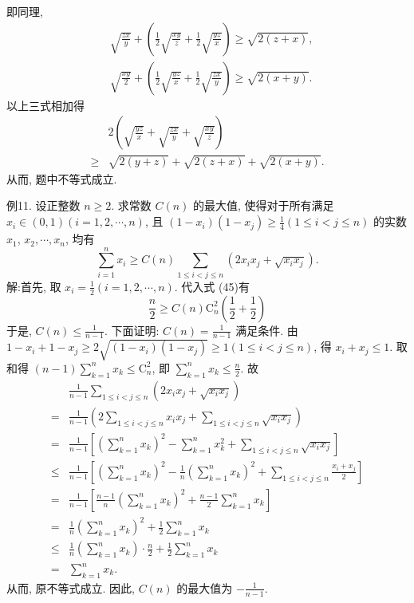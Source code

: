 即同理,
$$
\begin{aligned}
& \sqrt{\frac{z x}{y}}+\left(\frac{1}{2} \sqrt{\frac{x y}{z}}+\frac{1}{2} \sqrt{\frac{y z}{x}}\right) \geqslant \sqrt{2(z+x)}, \\
& \sqrt{\frac{x y}{2}}+\left(\frac{1}{2} \sqrt{\frac{y z}{x}}+\frac{1}{2} \sqrt{\frac{z x}{y}}\right) \geqslant \sqrt{2(x+y)} .
\end{aligned}
$$
以上三式相加得
$$
\begin{aligned}
& 2\left(\sqrt{\frac{y z}{x}}+\sqrt{\frac{z x}{y}}+\sqrt{\frac{x y}{z}}\right) \\
\geqslant & \sqrt{2(y+z)}+\sqrt{2(z+x)}+\sqrt{2(x+y)} .
\end{aligned}
$$
从而, 题中不等式成立.



例11. 设正整数 $n \geqslant 2$. 求常数 $C(n)$ 的最大值, 使得对于所有满足 $x_i \in (0,1)(i=1,2, \cdots, n)$, 且 $\left(1-x_i\right)\left(1-x_j\right) \geqslant \frac{1}{4}(1 \leqslant i<j \leqslant n)$ 的实数 $x_1$, $x_2, \cdots, x_n$, 均有
$$
\sum_{i=1}^n x_i \geqslant C(n) \sum_{1 \leqslant i<j \leqslant n}\left(2 x_i x_j+\sqrt{x_i x_j}\right) . \label{(45)}
$$
解:首先, 取 $x_i=\frac{1}{2}(i=1,2, \cdots, n)$. 代入式 (45)有
$$
\frac{n}{2} \geqslant C(n) \mathrm{C}_n^2\left(\frac{1}{2}+\frac{1}{2}\right)
$$
于是, $C(n) \leqslant \frac{1}{n-1}$.
下面证明: $C(n)=\frac{1}{n-1}$ 满足条件.
由 $1-x_i+1-x_j \geqslant 2 \sqrt{\left(1-x_i\right)\left(1-x_j\right)} \geqslant 1(1 \leqslant i<j \leqslant n)$, 得 $x_i+ x_j \leqslant 1$.
取和得 $(n-1) \sum_{k=1}^n x_k \leqslant \mathrm{C}_n^2$, 即 $\sum_{k=1}^n x_k \leqslant \frac{n}{2}$.
故
$$
\begin{aligned}
& \frac{1}{n-1} \sum_{1 \leqslant i<j \leqslant n}\left(2 x_i x_j+\sqrt{x_i x_j}\right) \\
= & \frac{1}{n-1}\left(2 \sum_{1 \leqslant i<j \leqslant n} x_i x_j+\sum_{1 \leqslant i<j \leqslant n} \sqrt{x_i x_j}\right) \\
= & \frac{1}{n-1}\left[\left(\sum_{k=1}^n x_k\right)^2-\sum_{k=1}^n x_k^2+\sum_{1 \leqslant i<j \leqslant n} \sqrt{x_i x_j}\right] \\
\leqslant & \frac{1}{n-1}\left[\left(\sum_{k=1}^n x_k\right)^2-\frac{1}{n}\left(\sum_{k=1}^n x_k\right)^2+\sum_{1 \leqslant i<j \leqslant n} \frac{x_i+x_j}{2}\right] \\
= & \frac{1}{n-1}\left[\frac{n-1}{n}\left(\sum_{k=1}^n x_k\right)^2+\frac{n-1}{2} \sum_{k=1}^n x_k\right] \\
= & \frac{1}{n}\left(\sum_{k=1}^n x_k\right)^2+\frac{1}{2} \sum_{k=1}^n x_k \\
\leqslant & \frac{1}{n}\left(\sum_{k=1}^n x_k\right) \cdot \frac{n}{2}+\frac{1}{2} \sum_{k=1}^n x_k \\
= & \sum_{k=1}^n x_k .
\end{aligned}
$$
从而, 原不等式成立.
因此, $C(n)$ 的最大值为 $-\frac{1}{n-1}$.




